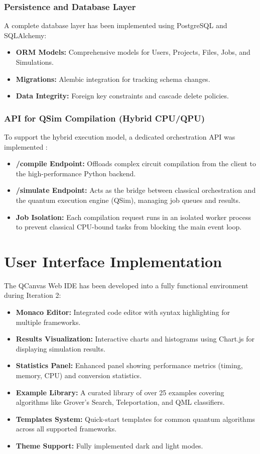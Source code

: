 \subsubsection{Persistence and Database Layer}
A complete database layer has been implemented using PostgreSQL and SQLAlchemy:
\begin{itemize}
    \item \textbf{ORM Models:} Comprehensive models for Users, Projects, Files, Jobs, and Simulations.
    \item \textbf{Migrations:} Alembic integration for tracking schema changes.
    \item \textbf{Data Integrity:} Foreign key constraints and cascade delete policies.
\end{itemize}

\subsubsection{API for QSim Compilation (Hybrid CPU/QPU)}
To support the hybrid execution model, a dedicated orchestration API was implemented \cite{peruzzo2014variational}:
\begin{itemize}
    \item \textbf{/compile Endpoint:} Offloads complex circuit compilation from the client to the high-performance Python backend.
    \item \textbf{/simulate Endpoint:} Acts as the bridge between classical orchestration and the quantum execution engine (QSim), managing job queues and results.
    \item \textbf{Job Isolation:} Each compilation request runs in an isolated worker process to prevent classical CPU-bound tasks from blocking the main event loop.
\end{itemize}

\section{User Interface Implementation}

The QCanvas Web IDE has been developed into a fully functional environment during Iteration 2:

\begin{itemize}
    \item \textbf{Monaco Editor:} Integrated code editor with syntax highlighting for multiple frameworks.
    \item \textbf{Results Visualization:} Interactive charts and histograms using Chart.js for displaying simulation results.
    \item \textbf{Statistics Panel:} Enhanced panel showing performance metrics (timing, memory, CPU) and conversion statistics.
    \item \textbf{Example Library:} A curated library of over 25 examples covering algorithms like Grover's Search, Teleportation, and QML classifiers.
    \item \textbf{Templates System:} Quick-start templates for common quantum algorithms across all supported frameworks.
    \item \textbf{Theme Support:} Fully implemented dark and light modes.
\end{itemize}

